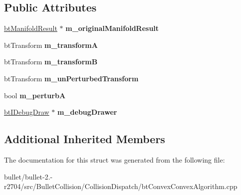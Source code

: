 \subsection*{Public Attributes}
\begin{DoxyCompactItemize}
\item 
\hypertarget{structbt_perturbed_contact_result_a8ad42c06006183d2a2e723ff6769bcb2}{\hyperlink{classbt_manifold_result}{bt\+Manifold\+Result} $\ast$ {\bfseries m\+\_\+original\+Manifold\+Result}}\label{structbt_perturbed_contact_result_a8ad42c06006183d2a2e723ff6769bcb2}

\item 
\hypertarget{structbt_perturbed_contact_result_aa78dad17b327cef2f53ecdf6a549b8e8}{bt\+Transform {\bfseries m\+\_\+transform\+A}}\label{structbt_perturbed_contact_result_aa78dad17b327cef2f53ecdf6a549b8e8}

\item 
\hypertarget{structbt_perturbed_contact_result_a8adc56e343b98c15405a3c3d0ea01781}{bt\+Transform {\bfseries m\+\_\+transform\+B}}\label{structbt_perturbed_contact_result_a8adc56e343b98c15405a3c3d0ea01781}

\item 
\hypertarget{structbt_perturbed_contact_result_ab60a34a8ed281e26742e975075f1927a}{bt\+Transform {\bfseries m\+\_\+un\+Perturbed\+Transform}}\label{structbt_perturbed_contact_result_ab60a34a8ed281e26742e975075f1927a}

\item 
\hypertarget{structbt_perturbed_contact_result_a52f4917e38fd7c982893b261dfcfb5bc}{bool {\bfseries m\+\_\+perturb\+A}}\label{structbt_perturbed_contact_result_a52f4917e38fd7c982893b261dfcfb5bc}

\item 
\hypertarget{structbt_perturbed_contact_result_a234cc30a82d70a9c789665b7a2f21995}{\hyperlink{classbt_i_debug_draw}{bt\+I\+Debug\+Draw} $\ast$ {\bfseries m\+\_\+debug\+Drawer}}\label{structbt_perturbed_contact_result_a234cc30a82d70a9c789665b7a2f21995}

\end{DoxyCompactItemize}
\subsection*{Additional Inherited Members}


The documentation for this struct was generated from the following file\+:\begin{DoxyCompactItemize}
\item 
bullet/bullet-\/2.-\/r2704/src/\+Bullet\+Collision/\+Collision\+Dispatch/bt\+Convex\+Convex\+Algorithm.\+cpp\end{DoxyCompactItemize}
